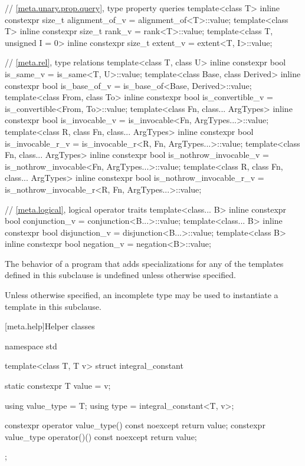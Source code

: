 \begin{codeblock}
{  // \ref{meta.unary.prop.query}, type property queries
  template<class T>
    inline constexpr size_t alignment_of_v = alignment_of<T>::value;
  template<class T>
    inline constexpr size_t rank_v = rank<T>::value;
  template<class T, unsigned I = 0>
    inline constexpr size_t extent_v = extent<T, I>::value;

  // \ref{meta.rel}, type relations
  template<class T, class U>
    inline constexpr bool is_same_v = is_same<T, U>::value;
  template<class Base, class Derived>
    inline constexpr bool is_base_of_v = is_base_of<Base, Derived>::value;
  template<class From, class To>
    inline constexpr bool is_convertible_v = is_convertible<From, To>::value;
  template<class Fn, class... ArgTypes>
    inline constexpr bool is_invocable_v = is_invocable<Fn, ArgTypes...>::value;
  template<class R, class Fn, class... ArgTypes>
    inline constexpr bool is_invocable_r_v = is_invocable_r<R, Fn, ArgTypes...>::value;
  template<class Fn, class... ArgTypes>
    inline constexpr bool is_nothrow_invocable_v = is_nothrow_invocable<Fn, ArgTypes...>::value;
  template<class R, class Fn, class... ArgTypes>
    inline constexpr bool is_nothrow_invocable_r_v
      = is_nothrow_invocable_r<R, Fn, ArgTypes...>::value;

  // \ref{meta.logical}, logical operator traits
  template<class... B>
    inline constexpr bool conjunction_v = conjunction<B...>::value;
  template<class... B>
    inline constexpr bool disjunction_v = disjunction<B...>::value;
  template<class B>
    inline constexpr bool negation_v = negation<B>::value;
}
\end{codeblock}

\pnum
The behavior of a program that adds specializations for any of
the templates defined in this subclause is undefined unless otherwise specified.

\pnum
Unless otherwise specified, an incomplete type may be used
to instantiate a template in this subclause.

[meta.help]{Helper classes}

%
\begin{codeblock}
namespace std {
  template<class T, T v> struct integral_constant {
    static constexpr T value = v;

    using value_type = T;
    using type = integral_constant<T, v>;

    constexpr operator value_type() const noexcept { return value; }
    constexpr value_type operator()() const noexcept { return value; }
  };
}
\end{codeblock}

